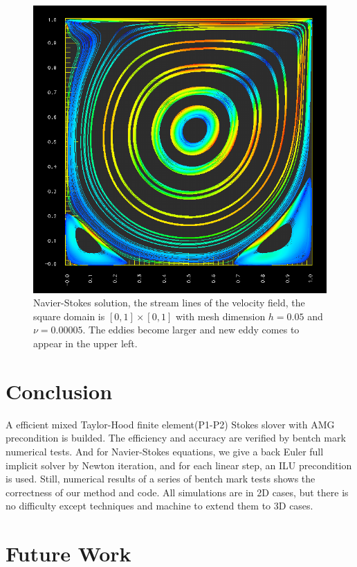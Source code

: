 \documentclass[a4paper]{article}
\begin{document}
\begin{figure}[h]
\centering
\includegraphics[scale = 0.5]{images/e.png}
\caption{Navier-Stokes solution, the stream lines of the velocity
  field, the square domain is $[0, 1] \times [0, 1]$ with mesh
  dimension $h=0.05$ and $\nu=0.00005$. The eddies become larger and
  new eddy comes to appear in the upper left.}
\label{im::d}
\end{figure}

\section{Conclusion}
A efficient mixed Taylor-Hood finite element(P1-P2) Stokes slover with
AMG precondition is builded. The efficiency and accuracy are verified
by bentch mark numerical tests. And for Navier-Stokes equations, we
give a back Euler full implicit solver by Newton iteration, and for
each linear step, an ILU precondition is used. Still, numerical
results of a series of bentch mark tests shows the correctness of our
method and code. All simulations are in 2D cases, but there is no
difficulty except techniques and machine to extend them to 3D cases.

\section{Future Work}
\end{document}
